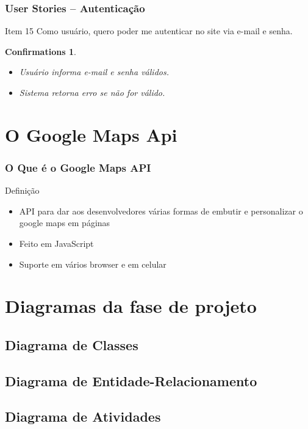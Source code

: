 \documentclass[hyperref={pdfpagelabels=false},11pt]{beamer}
\newtheorem{confirmations}[theorem]{Confirmations}
\begin{document}
			\begin{frame}
				\frametitle{User Stories -- Autenticação}	
				\begin{block}{Item 15}
					Como usuário, quero poder me autenticar no site via e-mail e senha.
					
					\begin{confirmations}
						\begin{itemize}
							\item Usuário informa e-mail e senha válidos.
							\item Sistema retorna erro se não for válido.
						\end{itemize}
					\end{confirmations}
				\end{block}
			\end{frame}			
			
			
				
		\section{O Google Maps Api}
			
			\begin{frame}
				\frametitle{O Que é o Google Maps API}
				\begin{block}{Definição}
					\begin{itemize}
						\item API para dar aos desenvolvedores várias formas de embutir e personalizar o google maps em páginas
						\item Feito em JavaScript
						\item Suporte em vários browser e em celular
					\end{itemize}	
				\end{block}						
			\end{frame}
			
		\section{Diagramas da fase de projeto}
			\subsection{Diagrama de Classes}
			\subsection{Diagrama de Entidade-Relacionamento}
			\subsection{Diagrama de Atividades}
	
\end{document}
